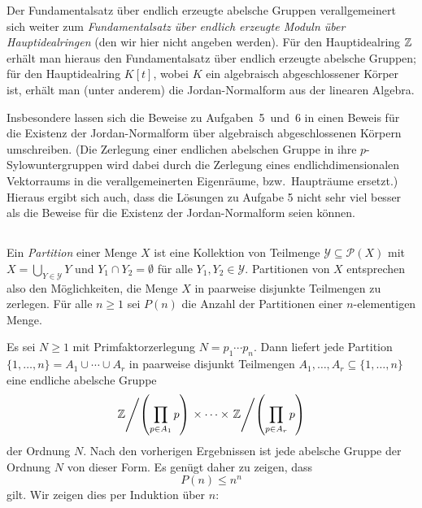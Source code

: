 \begin{remark}
  Der Fundamentalsatz über endlich erzeugte abelsche Gruppen verallgemeinert sich weiter zum \emph{Fundamentalsatz über endlich erzeugte Moduln über Hauptidealringen} (den wir hier nicht angeben werden).
  Für den Hauptidealring $\mathbb{Z}$ erhält man hieraus den Fundamentalsatz über endlich erzeugte abelsche Gruppen;
  für den Hauptidealring $K[t]$, wobei $K$ ein algebraisch abgeschlossener Körper ist, erhält man (unter anderem) die Jordan-Normalform aus der linearen Algebra.
  
  Insbesondere lassen sich die Beweise zu Aufgaben~5~und~6 in einen Beweis für die Existenz der Jordan-Normalform über algebraisch abgeschlossenen Körpern umschreiben.
  (Die Zerlegung einer endlichen abelschen Gruppe in ihre $p$-Sylowuntergruppen wird dabei durch die Zerlegung eines endlichdimensionalen Vektorraums in die verallgemeinerten Eigenräume, bzw.\ Haupträume ersetzt.)
  Hieraus ergibt sich auch, dass die Lösungen zu Aufgabe 5 nicht sehr viel besser als die Beweise für die Existenz der Jordan-Normalform seien können.
\end{remark}





\subsection{}


Ein \emph{Partition} einer Menge $X$ ist eine Kollektion von Teilmenge $\mathcal{Y} \subseteq \mathcal{P}(X)$ mit $X = \bigcup_{Y \in \mathcal{Y}} Y$ und $Y_1 \cap Y_2 = \emptyset$ für alle $Y_1, Y_2 \in \mathcal{Y}$.
Partitionen von $X$ entsprechen also den Möglichkeiten, die Menge $X$ in paarweise disjunkte Teilmengen zu zerlegen.
Für alle $n \geq 1$ sei $P(n)$ die Anzahl der Partitionen einer $n$-elementigen Menge.

Es sei $N \geq 1$ mit Primfaktorzerlegung $N = p_1 \dotsm p_n$.
Dann liefert jede Partition $\{1, \dotsc, n\} = A_1 \cup \dotsb \cup A_r$ in paarweise disjunkt Teilmengen $A_1, \dotsc, A_r \subseteq \{1, \dotsc, n\}$ eine endliche abelsche Gruppe
\[
          \left. \mathbb{Z} \middle/ \left( \prod_{p \in A_1} p \right) \right.
  \times  \dotsb
  \times  \left. \mathbb{Z} \middle/ \left( \prod_{p \in A_r} p \right) \right.
\]
der Ordnung $N$.
Nach den vorherigen Ergebnissen ist jede abelsche Gruppe der Ordnung $N$ von dieser Form.
Es genügt daher zu zeigen, dass
\[
  P(n) \leq n^n
\]
gilt.
Wir zeigen dies per Induktion über $n$:

